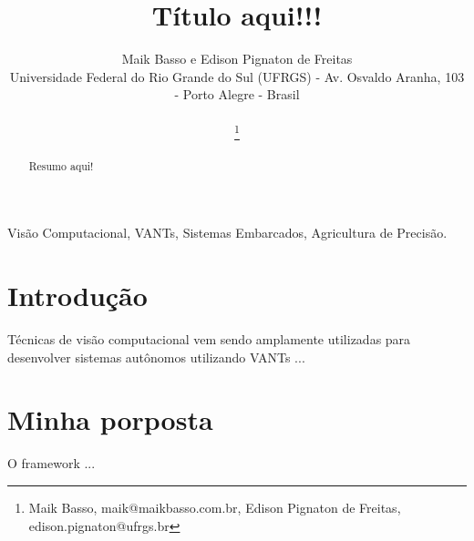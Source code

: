 \documentclass{ppgeesa}
\begin{document}
\title{Título aqui!!!}

\author{
	Maik Basso e Edison Pignaton de Freitas\\
	{Universidade Federal do Rio Grande do Sul (UFRGS) - Av. Osvaldo Aranha, 103 - Porto Alegre - Brasil} \\
	~\\
	\thanks{Maik Basso, maik@maikbasso.com.br, Edison Pignaton de Freitas, edison.pignaton@ufrgs.br}
}

\maketitle
\thispagestyle{empty}\pagestyle{empty}

\begin{abstract} %
Resumo aqui!
\end{abstract} %

\begin{IEEEkeywords}
Visão Computacional, VANTs, Sistemas Embarcados, Agricultura de Precisão.
\end{IEEEkeywords}

\section{Introdução}
Técnicas de visão computacional vem sendo amplamente utilizadas para desenvolver sistemas autônomos utilizando VANTs \cite{7500600, 7500671}...

\section{Minha porposta}
O framework ...
\end{document}

